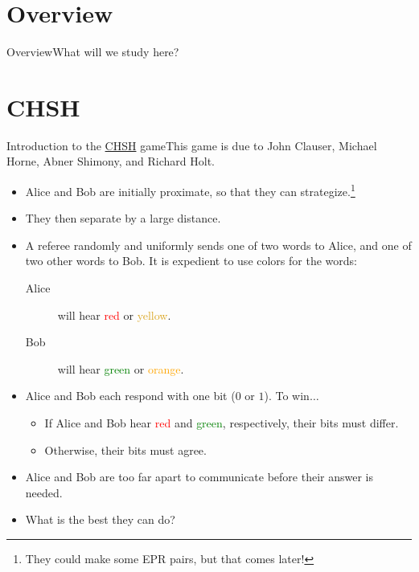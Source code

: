 
\section*{Overview}

\begin{frame}{Overview}{What will we study here?}
\end{frame}

\section*{CHSH}

{%
\def\Red{Red}\def\Yellow{Goldenrod}\def\Green{green}\def\Orange{orange}%
\def\RD#1{\textcolor{\Red}{#1}}
\def\YL#1{\textcolor{\Yellow}{#1}}
\def\GN#1{\textcolor{\Green}{#1}}
\def\OR#1{\textcolor{\Orange}{#1}}
\begin{frame}{Introduction to the \href{https://en.wikipedia.org/wiki/CHSH_game}{CHSH} game}{This game is due to John Clauser, Michael Horne, Abner Shimony, and Richard Holt.}
    \begin{itemize}[<+->]
        \item Alice and Bob are initially proximate, so that they can strategize.\footnote{They could make some EPR pairs, but that comes later!}
        \item They then separate by a large distance.
        \item A referee randomly and uniformly sends one of two words to Alice, and one of two other words to Bob.  It is expedient to use colors for the words:
        \begin{description}
            \item[Alice] will hear \RD{red} or \YL{yellow}.
            \item[Bob] will hear \GN{green} or \OR{orange}.
        \end{description}
    \item Alice and Bob each respond with one bit ($0$ or $1$).  To win$\ldots$
    \begin{itemize}
        \item If Alice and Bob hear \RD{red} and \GN{green}, respectively, their bits must differ.
        \item Otherwise, their bits must agree.
    \end{itemize}
    \item Alice and Bob are too far apart to communicate before their answer is needed.
    \item What is the best they can do?
    \end{itemize}
\end{frame}%

}
